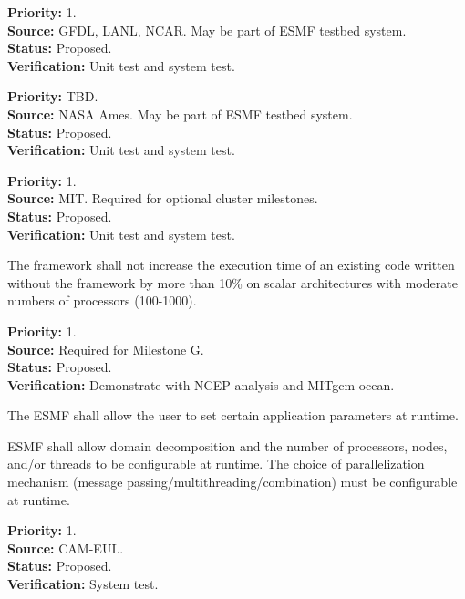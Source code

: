 \begin{reqlist}
{\bf Priority:} 1. \\
{\bf Source:} GFDL, LANL, NCAR.  May be part of ESMF testbed system. \\
{\bf Status:} Proposed. \\
{\bf Verification:} Unit test and system test.
\end{reqlist}

\begin{reqlist}
{\bf Priority:} TBD. \\
{\bf Source:} NASA Ames.  May be part of ESMF testbed system. \\
{\bf Status:} Proposed. \\
{\bf Verification:} Unit test and system test.
\end{reqlist}

\begin{reqlist}
{\bf Priority:} 1. \\
{\bf Source:} MIT.  Required for optional cluster milestones. \\
{\bf Status:} Proposed. \\
{\bf Verification:} Unit test and system test.
\end{reqlist}

The framework shall not increase the execution time of an existing code 
written without the framework by more than 10\% on scalar 
architectures with moderate numbers of processors (100-1000).
\begin{reqlist}
{\bf Priority:} 1. \\
{\bf Source:} Required for Milestone G. \\
{\bf Status:} Proposed. \\
{\bf Verification:} Demonstrate with NCEP analysis and MITgcm ocean.
\end{reqlist}

The ESMF shall allow the user to set certain application parameters at runtime.

ESMF shall allow domain decomposition and the number of processors, 
nodes, and/or threads to be configurable at runtime.  The choice of
parallelization mechanism (message passing/multithreading/combination)
must be configurable at runtime.
\begin{reqlist}
{\bf Priority:} 1. \\
{\bf Source:} CAM-EUL. \\
{\bf Status:} Proposed. \\
{\bf Verification:} System test.
\end{reqlist}

